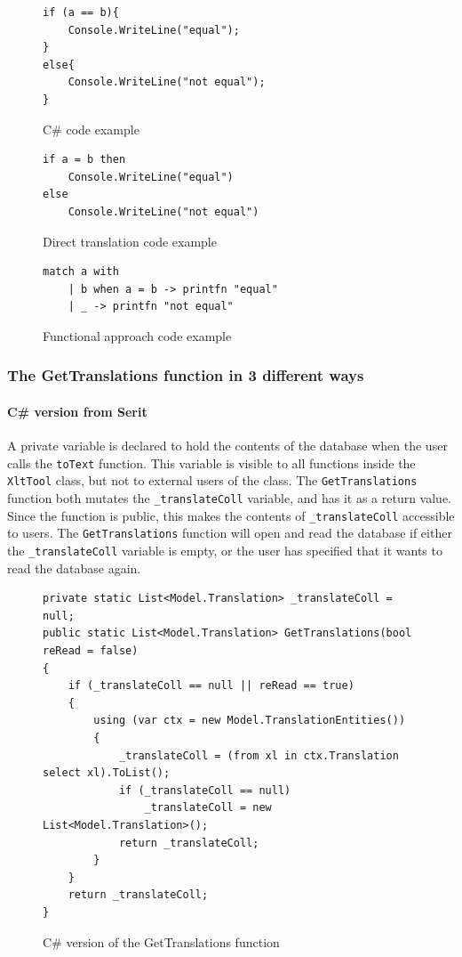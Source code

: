 \documentclass[12pt, a4paper]{article}
\newcommand{\code}[1]{{\small \texttt{#1}}}
\begin{document}
\newpage

\begin{figure}[!h]
\begin{lstlisting}
if (a == b){
	Console.WriteLine("equal");
}
else{
	Console.WriteLine("not equal");
}
\end{lstlisting}
\caption{C\# code example}
\label{fig:CSharpIf}
\end{figure}

\begin{figure}[!h]
\begin{lstlisting}
if a = b then 
	Console.WriteLine("equal")
else 
	Console.WriteLine("not equal")
\end{lstlisting}
\caption{Direct translation code example}
\label{fig:directTranslationIf}
\end{figure}

\begin{figure}[!h]
\begin{lstlisting}
match a with
    | b when a = b -> printfn "equal"
    | _ -> printfn "not equal"
\end{lstlisting}
\caption{Functional approach code example}
\label{fig:functionalApproachIf}
\end{figure}

\newpage


\subsubsection{The GetTranslations function in 3 different ways}
\paragraph{C\# version from Serit} A private variable is declared to hold the contents of the database when the user calls the \code{toText} function. This variable is visible to all functions inside the \code{XltTool} class, but not to external users of the class. The \code{GetTranslations} function both mutates the \code{\_translateColl} variable, and has it as a return value. Since the function is public, this makes the contents of \code{\_translateColl} accessible to users. The \code{GetTranslations} function will open and read the database if either the \code{\_translateColl} variable is empty, or the user has specified that it wants to read the database again.

\begin{figure}[!h]
\begin{lstlisting}
private static List<Model.Translation> _translateColl = null; 
public static List<Model.Translation> GetTranslations(bool reRead = false)
{
    if (_translateColl == null || reRead == true)
    {
        using (var ctx = new Model.TranslationEntities())
        {
            _translateColl = (from xl in ctx.Translation select xl).ToList();
            if (_translateColl == null)
                _translateColl = new List<Model.Translation>();
            return _translateColl;
        }
    }
    return _translateColl;
}
\end{lstlisting}
\caption{C\# version of the GetTranslations function}
\end{figure}
\end{document}
